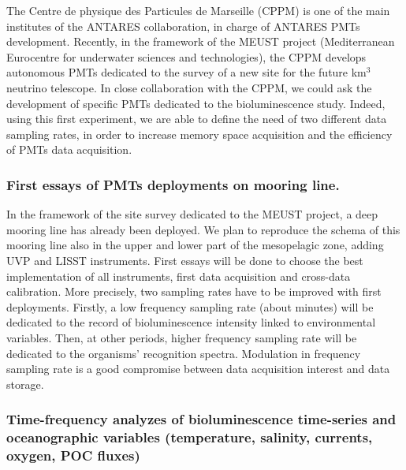 The Centre de physique des Particules de Marseille (CPPM) is one of the main institutes of the ANTARES collaboration, in charge of ANTARES PMTs development. Recently, in the framework of the MEUST project (Mediterranean Eurocentre for underwater sciences and technologies), the CPPM develops autonomous PMTs dedicated to the survey of a new site for the future km$^3$ neutrino telescope. In close collaboration with the CPPM, we could ask the development of specific PMTs dedicated to the bioluminescence study. Indeed, using this first experiment, we are able to define the need of two different data sampling rates, in order to increase memory space acquisition and the efficiency of PMTs data acquisition.\\

\subsubsection*{First essays of PMTs deployments on mooring line.} 

In the framework of the site survey dedicated to the MEUST project, a deep mooring line has already been deployed. We plan to reproduce the schema of this mooring line also in the upper and lower part of the mesopelagic zone, adding UVP and LISST instruments. First essays will be done to choose the best implementation of all instruments, first data acquisition and cross-data calibration. More precisely, two sampling rates have to be improved with first deployments. Firstly, a low frequency sampling rate (about minutes) will be dedicated to the record of bioluminescence intensity linked to environmental variables. Then, at other periods, higher frequency sampling rate will be dedicated to the organisms' recognition spectra. Modulation in frequency sampling rate is a good compromise between data acquisition interest and data storage. \\

\subsubsection*{Time-frequency analyzes of bioluminescence time-series and oceanographic variables (temperature, salinity, currents, oxygen, POC fluxes)}

